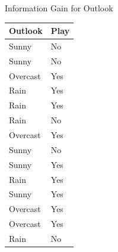 \documentclass[usenames,dvipsnames]{beamer}
\begin{document}
\begin{frame}{Information Gain for Outlook}
\begin{tabular}{l|l} \toprule
\textbf{Outlook} & \textbf{Play} \\ \midrule
Sunny    & No   \\
Sunny    & No   \\
Overcast & Yes  \\
Rain     & Yes  \\
Rain     & Yes  \\
Rain     & No   \\
Overcast & Yes  \\
Sunny    & No   \\
Sunny    & Yes  \\
Rain     & Yes  \\
Sunny    & Yes  \\
Overcast & Yes  \\
Overcast & Yes  \\
Rain     & No  \\ \bottomrule
\end{tabular}
\end{frame}
\end{document}
